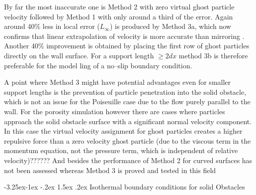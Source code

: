\documentclass[11pt,a4paper,twoside]{report}
\makeatletter
\renewcommand\paragraph{\@startsection{paragraph}{4}{\z@}%
  {-3.25ex\@plus -1ex \@minus -.2ex}%
  {1.5ex \@plus .2ex}%
  {\normalfont\normalsize\bfseries}}
\makeatother
\begin{document}
 By far the most inaccurate one is Method 2 with zero virtual ghost particle velocity followed by Method 1 with only around a third of the error. Again around 40\% less in local error ($L_\infty$) is produced by Method 3a, which now confirms that linear extrapolation of velocity is more accurate than mirroring \cite{Basa2009}. Another 40\% improvement is obtained by placing the first row of ghost particles directly on the wall surface.
For a support length $\geq2dx$ method 3b is therefore preferable for the model ling of a no--slip boundary condition. 

A point where Method 3 might have potential advantages even for smaller support lengths is the prevention of particle penetration into the solid obstacle, which is not an issue for the Poiseuille case due to the flow purely parallel to the wall. For the porosity simulation however there are cases where particles approach the solid obstacle surface with a significant normal velocity component. In this case the virtual velocity assignment for ghost particles creates a higher repulsive force than a zero velocity ghost particle (due to the viscous term in the momentum equation, not the pressure term, which is independent of relative velocity)??????
And besides the performance of Method 2 for curved surfaces has not been assessed whereas Method 3 is proved and tested in this field \cite{Morris1997, Zhu1999}





\paragraph{Isothermal boundary conditions for solid Obstacles}
\label{sec:TestSolobs_BC_Isothermal}
\end{document}
